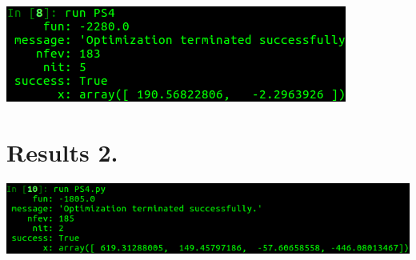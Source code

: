 \documentclass{article}
\begin{document}
\includegraphics[scale = .65]{Results1A_4}\\

\newpage

\section*{Results 2.}

\includegraphics[scale = .65]{Results2}
\end{document}
